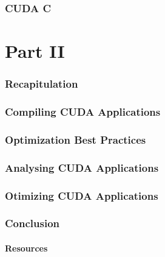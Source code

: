\documentclass[10pt, compress]{beamer}
\begin{document}
\section{CUDA C}

\part{Part II}

\section{Recapitulation}

\section{Compiling CUDA Applications}

\section{Optimization Best Practices}

\section{Analysing CUDA Applications}

\section{Otimizing CUDA Applications}

\section{Conclusion}

\subsection{Resources}
\end{document}
